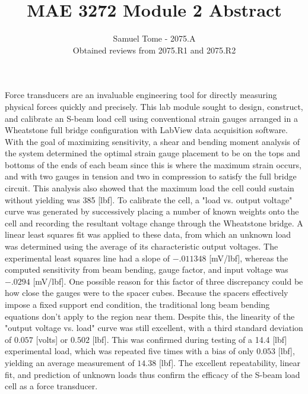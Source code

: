 \documentclass[11pt]{article}
\begin{document}
 

 
\title{MAE 3272 Module 2 Abstract}
\author{Samuel Tome - 2075.A \\ Obtained reviews from 2075.R1 and 2075.R2}
\maketitle



Force transducers are an invaluable engineering tool for directly measuring physical forces quickly and precisely.  This lab module sought to design, construct, and calibrate an S-beam load cell using conventional strain gauges arranged in a Wheatstone full bridge configuration with LabView data acquisition software.  With the goal of maximizing sensitivity, a shear and bending moment analysis of the system determined the optimal strain gauge placement to be on the tops and bottoms of the ends of each beam since this is where the maximum strain occurs, and with two gauges in tension and two in compression to satisfy the full bridge circuit.  This analysis also showed that the maximum load the cell could sustain without yielding was 385 [lbf].  To calibrate the cell, a "load vs. output voltage" curve was generated by successively placing a number of known weights onto the cell and recording the resultant voltage change through the Wheatstone bridge.  A linear least squares fit was applied to these data, from which an unknown load was determined using the average of its characteristic output voltages.  The experimental least squares line had a slope of $-.011348 $ [mV/lbf], whereas the computed sensitivity from beam bending, gauge factor, and input voltage was $ -.0294 $ [mV/lbf].  One possible reason for this factor of three discrepancy could be how close the gauges were to the spacer cubes.  Because the spacers effectively impose a fixed support end condition, the traditional long beam bending equations don't apply to the region near them.  Despite this, the linearity of the "output voltage vs. load" curve was still excellent, with a third standard deviation of $0.057$ [volts] or $0.502$ [lbf].  This was confirmed during testing of a 14.4 [lbf] experimental load, which was repeated five times with a bias of only $0.053$ [lbf], yielding an average measurement of $14.38$ [lbf].  The excellent repeatability, linear fit, and prediction of unknown loads thus confirm the efficacy of the S-beam load cell as a force transducer.
\end{document}
